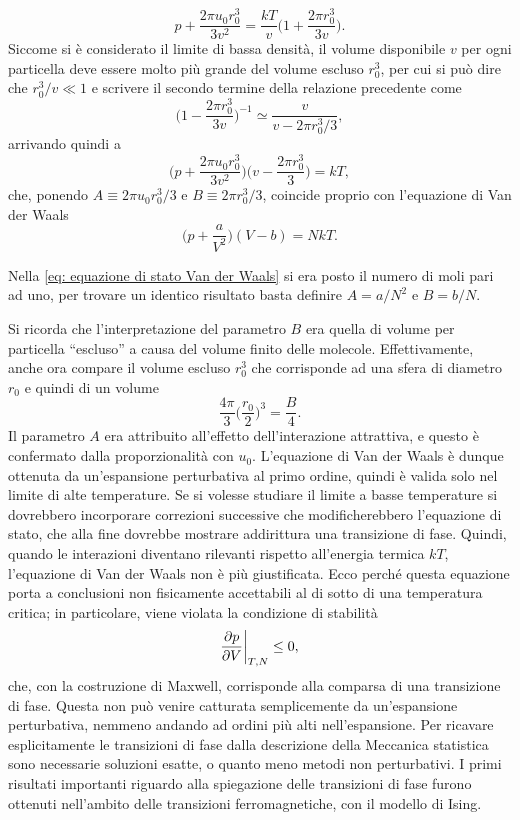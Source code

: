 \begin{equation}
    p + \frac{2\pi u_0r_0^3}{3v^2} = \frac{kT}{v}\bigg(1 + \frac{2\pi r_0^3}{3v}\bigg).
\end{equation}
Siccome si è considerato il limite di bassa densità, il volume disponibile $v$ per ogni particella deve essere molto più grande del volume escluso $r_0^3$, per cui si può dire che $r_0^3/v \ll 1$ e scrivere il secondo termine della relazione precedente come
\begin{equation}
    \bigg(1 - \frac{2\pi r_0^3}{3v}\bigg)^{-1} \simeq \frac{v}{v - 2\pi r_0^3/3},
\end{equation}
arrivando quindi a 
\begin{equation}
     \bigg(p + \frac{2\pi u_0r_0^3}{3v^2}\bigg)\bigg(v - \frac{2\pi r_0^3}{3}\bigg) = kT,
\end{equation}
che, ponendo $A \equiv 2\pi u_0r_0^3/3$ e $B \equiv 2\pi r_0^3/3$, coincide proprio con l'equazione di Van der Waals
\begin{equation}
    \bigg(p + \frac{a}{V^2}\bigg)(V - b) = NkT.
\end{equation}
\begin{obs}
    Nella \eqref{eq: equazione di stato Van der Waals} si era posto il numero di moli pari ad uno, per trovare un identico risultato basta definire $A = a/N^2$ e $B = b/N$.
\end{obs}
Si ricorda che l'interpretazione del parametro $B$ era quella di volume per particella ``escluso'' a causa del volume finito delle molecole. Effettivamente, anche ora compare il volume escluso $r_0^3$ che corrisponde ad una sfera di diametro $r_0$ e quindi di un volume
\begin{equation}
    \frac{4\pi}{3}\bigg(\frac{r_0}{2}\bigg)^3 = \frac{B}{4}.
\end{equation}
Il parametro $A$ era attribuito all'effetto dell'interazione attrattiva, e questo è confermato dalla proporzionalità con $u_0$. L'equazione di Van der Waals è dunque ottenuta da un'espansione perturbativa al primo ordine, quindi è valida solo nel limite di alte temperature. Se si volesse studiare il limite a basse temperature si dovrebbero incorporare correzioni successive che modificherebbero l'equazione di stato, che alla fine dovrebbe mostrare addirittura una transizione di fase. Quindi, quando le interazioni diventano rilevanti rispetto all'energia termica $kT$, l'equazione di Van der Waals non è più giustificata. Ecco perché questa equazione porta a conclusioni non fisicamente accettabili al di sotto di una temperatura critica; in particolare, viene violata la condizione di stabilità
\begin{equation}
    \frac{\partial p}{\partial V}\bigg|_{T,N} \le 0,
\end{equation}
che, con la costruzione di Maxwell, corrisponde alla comparsa di una transizione di fase. Questa non può venire catturata semplicemente da un'espansione perturbativa, nemmeno andando ad ordini più alti nell'espansione. Per ricavare esplicitamente le transizioni di fase dalla descrizione della Meccanica statistica sono necessarie soluzioni esatte, o quanto meno metodi non perturbativi. I primi risultati importanti riguardo alla spiegazione delle transizioni di fase furono ottenuti nell'ambito delle transizioni ferromagnetiche, con il modello di Ising.